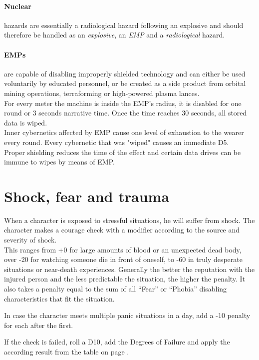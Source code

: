 \documentclass[12pt,a4paper,openany,usenames,dvipsnames]{book}
\begin{document}
	\paragraph{Nuclear} hazards are essentially a radiological hazard following an explosive and should therefore be handled as an \emph{explosive}, an \emph{EMP} and a \emph{radiological} hazard.
	\paragraph{EMPs} are capable of disabling improperly shielded technology and can either be used voluntarily by educated personnel, or be created as a side product from orbital mining operations, terraforming or high-powered plasma lances.\\
	For every meter the machine is inside the EMP’s radius, it is disabled for one round or 3 seconds narrative time. Once the time reaches 30 seconds, all stored data is wiped.\\
	Inner cybernetics affected by EMP cause one level of exhaustion to the wearer every round. Every cybernetic that was "wiped" causes an immediate D5.\\
	Proper shielding reduces the time of the effect and certain data drives can be immune to wipes by means of EMP.
%	
	\section{Shock, fear and trauma}
	When a character is exposed to stressful situations, he will suffer from shock. The character makes a courage check with a modifier according to the source and severity of shock.\\
	This ranges from +0 for large amounts of blood or an unexpected dead body, over -20 for watching someone die in front of oneself, to -60 in truly desperate situations or near-death experiences.
	Generally the better the reputation with the injured person and the less predictable the situation, the higher the penalty. It also takes a penalty equal to the sum of all “Fear” or “Phobia” disabling characteristics that fit the situation.
	\par \vspace{-5mm}
	In case the character meets multiple panic situations in a day, add a -10 penalty for each after the first.
	\par \vspace{-5mm}
	If the check is failed, roll a D10, add the Degrees of Failure and apply the according result from the table on page \pageref{feartable}.
	
\end{document}
